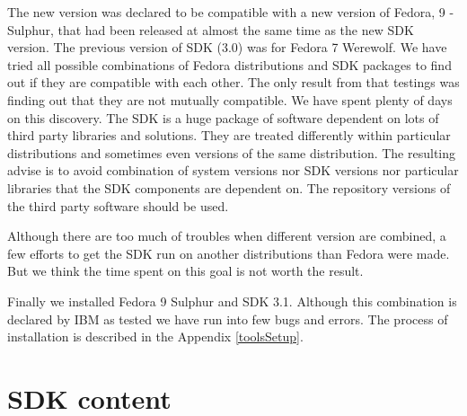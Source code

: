 \par
The new version was declared to be compatible with a new version of Fedora, 9 - Sulphur, that had been released at almost the same time as the new SDK version.
The previous version of SDK (3.0) was for Fedora 7 Werewolf.
We have tried all possible combinations of Fedora distributions and SDK packages to find out if they are compatible with each other.
The only result from that testings was finding out that they are not mutually compatible.
We have spent plenty of days on this discovery.
The SDK is a huge package of software dependent on lots of third party libraries and solutions.
They are treated differently within particular distributions and sometimes even versions of the same distribution.
The resulting advise is to avoid combination of system versions nor SDK versions nor particular libraries that the SDK components are dependent on.
The repository versions of the third party software should be used.

\par
Although there are too much of troubles when different version are combined, a few efforts to get the SDK run on another distributions than Fedora were made.
But we think the time spent on this goal is not worth the result.

\par
Finally we installed Fedora 9 Sulphur and SDK 3.1.
Although this combination is declared by IBM as tested we have run into few bugs and errors.
The process of installation is described in the Appendix \ref{toolsSetup}.

\section {SDK content}

